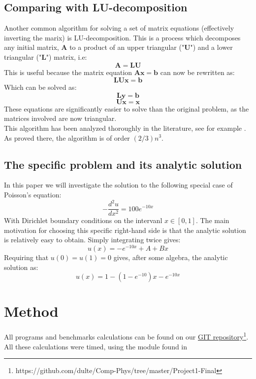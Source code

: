 \documentclass[a4paper, 10pt]{article}
\begin{document}
\subsection{Comparing with LU-decomposition}
Another common algorithm for solving a set of matrix equations (effectively inverting the marix) is LU-decomposition. This is a process which decomposes any initial matrix, $\mathbf{A}$ to a product of an upper triangular ("$\mathbf{U}$") and a lower triangular ("$\mathbf{L}$") matrix, i.e:
\begin{equation}
\mathbf{A}=\mathbf{L}\mathbf{U}
\end{equation}
This is useful because the matrix equation $\mathbf{A}\mathbf{x}=\mathbf{b}$ can now be rewritten as:
$$\mathbf{L}\mathbf{U}\mathbf{x}=\mathbf{b}$$
Which can be solved as:\\
\begin{equation}\label{eq:LU_1}
\mathbf{L}\mathbf{y}=\mathbf{b}
\end{equation}
\begin{equation}\label{eq:LU_2}
\mathbf{Ux}=\mathbf{x}
\end{equation} These equations are significantly easier to solve than the original problem, as the matrices involved are now triangular.\\
\linebreak This algorithm has been analyzed thoroughly in the literature, see for example \cite{LU-decomp}. As proved there, the algorithm is of order $(2/3)n^3$. 
\subsection{The specific problem and its analytic solution} \label{analytic_solution}
In this paper we will investigate the solution to the following special case of Poisson's equation:
\begin{equation}\label{eq:poisson_rhs}
-\frac{d^2 u}{dx^2}=100e^{-10x}
\end{equation}
With Dirichlet boundary conditions on the intervanl $x\in [0, 1]$. The main motivation for choosing this specific right-hand side is that the analytic solution is relatively easy to obtain. Simply integrating twice gives:
$$u(x)=-e^{-10x}+A+Bx$$
Requiring that $u(0)=u(1)=0$ gives, after some algebra, the analytic solution as:
\begin{equation}\label{eq:analytic_solution}
u(x)=1-(1-e^{-10})x-e^{-10x}
\end{equation}
\section{Method}\label{Method}
All programs and benchmarks calculations can be found on our \href{https://github.com/dulte/Comp-Phys/tree/master/Project1-Final}{GIT repository}\footnote{https://github.com/dulte/Comp-Phys/tree/master/Project1-Final}. All these calculations were timed, using the module found in \cite{Morten}
\end{document}
